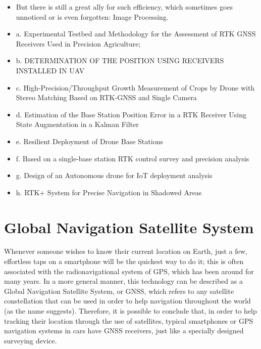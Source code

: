 \begin{itemize}
    \item But there is still a great ally for such efficiency, which sometimes goes unnoticed or is even forgotten: Image Processing.


    \item a. Experimental Testbed and Methodology for the Assessment of RTK GNSS Receivers Used in Precision Agriculture;

    \item b. DETERMINATION OF THE POSITION USING RECEIVERS INSTALLED IN UAV

    \item c. High-Precision/Throughput Growth Measurement of Crops by Drone with Stereo Matching Based on RTK-GNSS and Single Camera

    \item d. Estimation of the Base Station Position Error in a RTK Receiver Using State Augmentation in a Kalman Filter

    \item e. Resilient Deployment of Drone Base Stations

    \item f. Based on a single-base station RTK control survey and precision analysis 

    \item g. Design of an Autonomous drone for IoT deployment analysis 

    \item h. RTK+ System for Precise Navigation in Shadowed Areas 
\end{itemize}

\section{Global Navigation Satellite System}\label{sec:II_gnss}

Whenever someone wishes to know their current location on Earth, just a few, effortless taps on a smartphone will be the quickest way to do it; this is often associated with the radionavigational system of GPS, which has been around for many years. In a more general manner, this technology can be described as a Global Navigation Satellite System, or GNSS, which refers to any satellite constellation that can be used in order to help navigation throughout the world (as the name suggests).
Therefore, it is possible to conclude that, in order to help tracking their location through the use of satellites, typical smartphones or GPS navigation systems in cars have GNSS receivers, just like a specially designed surveying device.

